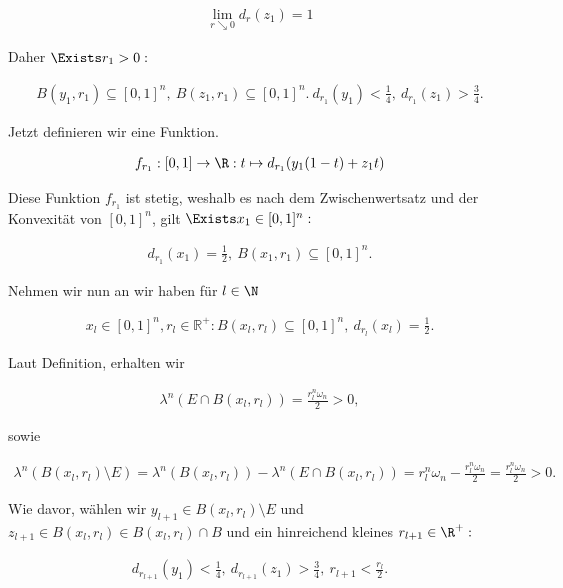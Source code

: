 \begin{solution}
\begin{align*}
    \lim_{r \searrow 0} d_r(z_1) = 1
\end{align*}

Daher $\Exists r_1 > 0:$

\begin{align*}
  B(y_1, r_1) \subseteq [0,1]^n, \:
  B(z_1, r_1) \subseteq [0,1]^n. \:
  d_{r_1}(y_1) < \frac{1}{4}, \:
  d_{r_1}(z_1) > \frac{3}{4}.
\end{align*}

Jetzt definieren wir eine Funktion.

\begin{align*}
    f_{r_1}:
    [0,1] \to \R:
    t \mapsto d_{r_1}(y_1(1-t)+z_1t)
\end{align*}

Diese Funktion $f_{r_1}$ ist stetig, weshalb es nach dem Zwischenwertsatz und der Konvexität von $[0,1]^n$, gilt $\Exists x_1 \in [0,1]^n:$

\begin{align*}
  d_{r_1}(x_1) = \frac{1}{2}, \:
  B(x_1, r_1) \subseteq [0,1]^n.
\end{align*}

Nehmen wir nun an wir haben für $l \in \N$

\begin{align*}
  x_l \in [0,1]^n,
  r_l \in \mathbb{R}^+:
  B(x_l,r_l) \subseteq [0,1]^n, \:
  d_{r_l}(x_l)=\frac{1}{2}.
\end{align*}

Laut Definition, erhalten wir

\begin{align*}
    \lambda^n (E \cap B(x_l, r_l)) =
    \frac{r_l^n \omega_n}{2} > 0,
\end{align*}

sowie

\begin{align*}
    \lambda^n(B(x_l, r_l) \setminus E)
    = \lambda^n(B(x_l, r_l)) -
      \lambda^n(E \cap B(x_l, r_l))
    = r_l^n \omega_n -
      \frac{r_l^n \omega_n}{2}
    = \frac{r_l^n \omega_n}{2} > 0.
\end{align*}

Wie davor, wählen wir $y_{l+1} \in B(x_l, r_l) \setminus E$ und $z_{l+1} \in B(x_l,r_l) \in B(x_l,r_l) \cap B$ und ein hinreichend kleines $r_{l+1} \in \R^+:$

\begin{align*}
    d_{r_{l+1}}(y_1) < \frac{1}{4}, \:
    d_{r_{l+1}}(z_1) > \frac{3}{4}, \:
    r_{l+1}<\frac{r_l}{2}.
\end{align*}


\end{solution}
